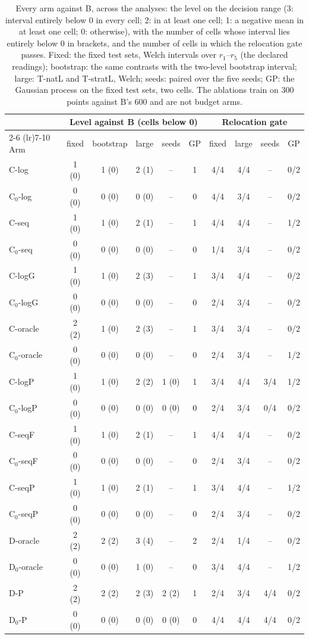 \begin{table}[htbp]
\centering
\small
\setlength{\tabcolsep}{3.5pt}
\caption{Every arm against B, across the analyses: the level on the decision range (3: interval entirely below 0 in every cell; 2: in at least one cell; 1: a negative mean in at least one cell; 0: otherwise), with the number of cells whose interval lies entirely below 0 in brackets, and the number of cells in which the relocation gate passes. Fixed: the fixed test sets, Welch intervals over $r_1$--$r_5$ (the declared readings); bootstrap: the same contrasts with the two-level bootstrap interval; large: T-natL and T-stratL, Welch; seeds: paired over the five seeds; GP: the Gaussian process on the fixed test sets, two cells. The ablations train on 300 points against B's 600 and are not budget arms.}
\label{tab:rev:levels}
\begin{tabular}{lccccc|cccc}
\toprule
 & \multicolumn{5}{c|}{Level against B (cells below 0)} & \multicolumn{4}{c}{Relocation gate} \\
\cmidrule(lr){2-6} \cmidrule(lr){7-10}
Arm & fixed & bootstrap & large & seeds & GP & fixed & large & seeds & GP \\
\midrule
C-log & 1 (0) & 1 (0) & 2 (1) & -- & 1 & 4/4 & 4/4 & -- & 0/2 \\
C$_0$-log & 0 (0) & 0 (0) & 0 (0) & -- & 0 & 4/4 & 3/4 & -- & 0/2 \\
C-seq & 1 (0) & 1 (0) & 2 (1) & -- & 1 & 4/4 & 4/4 & -- & 1/2 \\
C$_0$-seq & 0 (0) & 0 (0) & 0 (0) & -- & 0 & 1/4 & 3/4 & -- & 0/2 \\
C-logG & 1 (0) & 1 (0) & 2 (3) & -- & 1 & 3/4 & 4/4 & -- & 0/2 \\
C$_0$-logG & 0 (0) & 0 (0) & 0 (0) & -- & 0 & 2/4 & 3/4 & -- & 0/2 \\
C-oracle & 2 (2) & 1 (0) & 2 (3) & -- & 1 & 3/4 & 3/4 & -- & 0/2 \\
C$_0$-oracle & 0 (0) & 0 (0) & 0 (0) & -- & 0 & 2/4 & 3/4 & -- & 1/2 \\
C-logP & 1 (0) & 1 (0) & 2 (2) & 1 (0) & 1 & 3/4 & 4/4 & 3/4 & 1/2 \\
C$_0$-logP & 0 (0) & 0 (0) & 0 (0) & 0 (0) & 0 & 2/4 & 3/4 & 0/4 & 0/2 \\
C-seqF & 1 (0) & 1 (0) & 2 (1) & -- & 1 & 4/4 & 4/4 & -- & 0/2 \\
C$_0$-seqF & 0 (0) & 0 (0) & 0 (0) & -- & 0 & 2/4 & 3/4 & -- & 0/2 \\
C-seqP & 1 (0) & 1 (0) & 2 (1) & -- & 1 & 3/4 & 4/4 & -- & 1/2 \\
C$_0$-seqP & 0 (0) & 0 (0) & 0 (0) & -- & 0 & 2/4 & 3/4 & -- & 0/2 \\
D-oracle & 2 (2) & 2 (2) & 3 (4) & -- & 2 & 2/4 & 1/4 & -- & 0/2 \\
D$_0$-oracle & 0 (0) & 0 (0) & 1 (0) & -- & 0 & 3/4 & 4/4 & -- & 1/2 \\
D-P & 2 (2) & 2 (2) & 2 (3) & 2 (2) & 1 & 2/4 & 3/4 & 4/4 & 0/2 \\
D$_0$-P & 0 (0) & 0 (0) & 0 (0) & 0 (0) & 0 & 4/4 & 4/4 & 4/4 & 0/2 \\
\bottomrule
\end{tabular}
\end{table}
